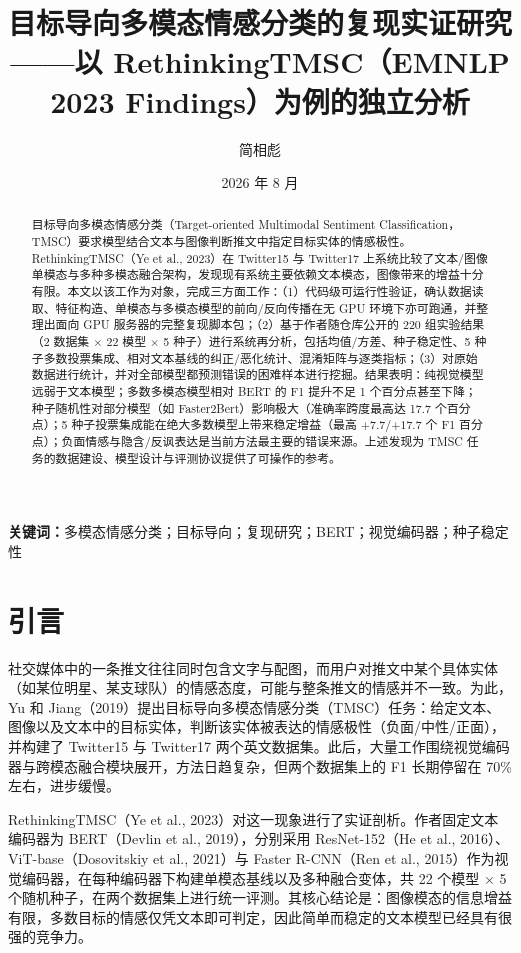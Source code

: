 \documentclass[11pt]{ctexart}
\title{\bfseries 目标导向多模态情感分类的复现实证研究\\[0.5em]
  \large ——以 RethinkingTMSC（EMNLP 2023 Findings）为例的独立分析}
\author{简相彪\\[0.5em]}
\date{2026 年 8 月}
\begin{document}
\maketitle

\begin{abstract}

目标导向多模态情感分类（Target-oriented Multimodal Sentiment Classification，TMSC）要求模型结合文本与图像判断推文中指定目标实体的情感极性。RethinkingTMSC（Ye et al., 2023）在 Twitter15 与 Twitter17 上系统比较了文本/图像单模态与多种多模态融合架构，发现现有系统主要依赖文本模态，图像带来的增益十分有限。本文以该工作为对象，完成三方面工作：（1）代码级可运行性验证，确认数据读取、特征构造、单模态与多模态模型的前向/反向传播在无 GPU 环境下亦可跑通，并整理出面向 GPU 服务器的完整复现脚本包；（2）基于作者随仓库公开的 220 组实验结果（2 数据集 $\times$ 22 模型 $\times$ 5 种子）进行系统再分析，包括均值/方差、种子稳定性、5 种子多数投票集成、相对文本基线的纠正/恶化统计、混淆矩阵与逐类指标；（3）对原始数据进行统计，并对全部模型都预测错误的困难样本进行挖掘。结果表明：纯视觉模型远弱于文本模型；多数多模态模型相对 BERT 的 F1 提升不足 1 个百分点甚至下降；种子随机性对部分模型（如 Faster2Bert）影响极大（准确率跨度最高达 17.7 个百分点）；5 种子投票集成能在绝大多数模型上带来稳定增益（最高 $+7.7$/$+17.7$ 个 F1 百分点）；负面情感与隐含/反讽表达是当前方法最主要的错误来源。上述发现为 TMSC 任务的数据建设、模型设计与评测协议提供了可操作的参考。
\end{abstract}

\noindent\textbf{关键词：}多模态情感分类；目标导向；复现研究；BERT；视觉编码器；种子稳定性


\section{引言}

社交媒体中的一条推文往往同时包含文字与配图，而用户对推文中某个具体实体（如某位明星、某支球队）的情感态度，可能与整条推文的情感并不一致。为此，Yu 和 Jiang（2019）提出目标导向多模态情感分类（TMSC）任务：给定文本、图像以及文本中的目标实体，判断该实体被表达的情感极性（负面/中性/正面），并构建了 Twitter15 与 Twitter17 两个英文数据集。此后，大量工作围绕视觉编码器与跨模态融合模块展开，方法日趋复杂，但两个数据集上的 F1 长期停留在 70\% 左右，进步缓慢。

RethinkingTMSC（Ye et al., 2023）对这一现象进行了实证剖析。作者固定文本编码器为 BERT（Devlin et al., 2019），分别采用 ResNet-152（He et al., 2016）、ViT-base（Dosovitskiy et al., 2021）与 Faster R-CNN（Ren et al., 2015）作为视觉编码器，在每种编码器下构建单模态基线以及多种融合变体，共 22 个模型 $\times$ 5 个随机种子，在两个数据集上进行统一评测。其核心结论是：图像模态的信息增益有限，多数目标的情感仅凭文本即可判定，因此简单而稳定的文本模型已经具有很强的竞争力。
\end{document}
